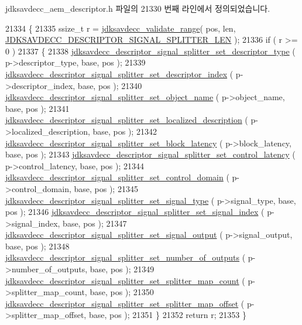 jdksavdecc\+\_\+aem\+\_\+descriptor.\+h 파일의 21330 번째 라인에서 정의되었습니다.


\begin{DoxyCode}
21334 \{
21335     ssize\_t r = \hyperlink{group__util_ga9c02bdfe76c69163647c3196db7a73a1}{jdksavdecc\_validate\_range}( pos, len, 
      \hyperlink{group__descriptor__signal__splitter_ga3afbcd74a73da7fe7c5eee3c13fad7f3}{JDKSAVDECC\_DESCRIPTOR\_SIGNAL\_SPLITTER\_LEN} );
21336     \textcolor{keywordflow}{if} ( r >= 0 )
21337     \{
21338         \hyperlink{group__descriptor__signal__splitter_ga26384b0bdf1407ece585e287f97437a7}{jdksavdecc\_descriptor\_signal\_splitter\_set\_descriptor\_type}
      ( p->descriptor\_type, base, pos );
21339         \hyperlink{group__descriptor__signal__splitter_ga4171ef73e03044a469eda3e124ece880}{jdksavdecc\_descriptor\_signal\_splitter\_set\_descriptor\_index}
      ( p->descriptor\_index, base, pos );
21340         \hyperlink{group__descriptor__signal__splitter_ga81033ad18000b6a2acb5a16ea11099ac}{jdksavdecc\_descriptor\_signal\_splitter\_set\_object\_name}
      ( p->object\_name, base, pos );
21341         \hyperlink{group__descriptor__signal__splitter_gab3b491da6e8d0d8a641b1aed25685aa5}{jdksavdecc\_descriptor\_signal\_splitter\_set\_localized\_description}
      ( p->localized\_description, base, pos );
21342         \hyperlink{group__descriptor__signal__splitter_ga41ebbed787c1b7b04579988a2650c408}{jdksavdecc\_descriptor\_signal\_splitter\_set\_block\_latency}
      ( p->block\_latency, base, pos );
21343         \hyperlink{group__descriptor__signal__splitter_gaa94265e3e443e7b13474ad68f0545eef}{jdksavdecc\_descriptor\_signal\_splitter\_set\_control\_latency}
      ( p->control\_latency, base, pos );
21344         \hyperlink{group__descriptor__signal__splitter_gad25d0a8f9430d6f76e712d50443046cb}{jdksavdecc\_descriptor\_signal\_splitter\_set\_control\_domain}
      ( p->control\_domain, base, pos );
21345         \hyperlink{group__descriptor__signal__splitter_ga6a5eddca6d1e8d8a2871c434239da9d7}{jdksavdecc\_descriptor\_signal\_splitter\_set\_signal\_type}
      ( p->signal\_type, base, pos );
21346         \hyperlink{group__descriptor__signal__splitter_gafd6b7a18498019837f1737507537a9bd}{jdksavdecc\_descriptor\_signal\_splitter\_set\_signal\_index}
      ( p->signal\_index, base, pos );
21347         \hyperlink{group__descriptor__signal__splitter_gad0c19d1d2b9480f059e3b21d9c6584b5}{jdksavdecc\_descriptor\_signal\_splitter\_set\_signal\_output}
      ( p->signal\_output, base, pos );
21348         \hyperlink{group__descriptor__signal__splitter_ga6ee3245ce275236474b9e60f8b556de9}{jdksavdecc\_descriptor\_signal\_splitter\_set\_number\_of\_outputs}
      ( p->number\_of\_outputs, base, pos );
21349         \hyperlink{group__descriptor__signal__splitter_gaf3115c9b9fb36ce705bb648f1513684f}{jdksavdecc\_descriptor\_signal\_splitter\_set\_splitter\_map\_count}
      ( p->splitter\_map\_count, base, pos );
21350         \hyperlink{group__descriptor__signal__splitter_ga1576dd48bf257db528152f1fe66e983e}{jdksavdecc\_descriptor\_signal\_splitter\_set\_splitter\_map\_offset}
      ( p->splitter\_map\_offset, base, pos );
21351     \}
21352     \textcolor{keywordflow}{return} r;
21353 \}
\end{DoxyCode}


